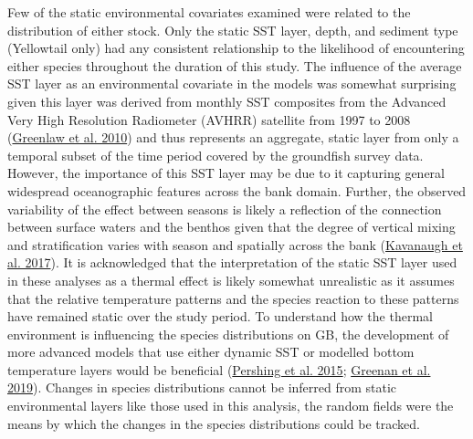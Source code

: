 \documentclass[
]{article}
\begin{document}
Few of the static environmental covariates examined were related to the distribution of either stock. Only the static SST layer, depth, and sediment type (Yellowtail only) had any consistent relationship to the likelihood of encountering either species throughout the duration of this study. The influence of the average SST layer as an environmental covariate in the models was somewhat surprising given this layer was derived from monthly SST composites from the Advanced Very High Resolution Radiometer (AVHRR) satellite from 1997 to 2008 (\protect\hyperlink{ref-greenlawGeodatabaseHistoricalContemporary2010}{Greenlaw et al. 2010}) and thus represents an aggregate, static layer from only a temporal subset of the time period covered by the groundfish survey data. However, the importance of this SST layer may be due to it capturing general widespread oceanographic features across the bank domain. Further, the observed variability of the effect between seasons is likely a reflection of the connection between surface waters and the benthos given that the degree of vertical mixing and stratification varies with season and spatially across the bank (\protect\hyperlink{ref-kavanaughThirtyThreeYearsOcean2017}{Kavanaugh et al. 2017}). It is acknowledged that the interpretation of the static SST layer used in these analyses as a thermal effect is likely somewhat unrealistic as it assumes that the relative temperature patterns and the species reaction to these patterns have remained static over the study period. To understand how the thermal environment is influencing the species distributions on GB, the development of more advanced models that use either dynamic SST or modelled bottom temperature layers would be beneficial (\protect\hyperlink{ref-pershingSlowAdaptationFace2015}{Pershing et al. 2015}; \protect\hyperlink{ref-greenanClimateChangeVulnerability2019}{Greenan et al. 2019}). Changes in species distributions cannot be inferred from static environmental layers like those used in this analysis, the random fields were the means by which the changes in the species distributions could be tracked.
\end{document}
